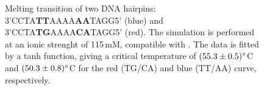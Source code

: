 \begin{figure}[htb]
       \begin{center}
               \scalebox{0.9}{
                        \nonstopmode
                        
                        \errorstopmode
                        \rule[-0.5cm]{0cm}{0cm}}
                \caption{Melting transition of two DNA hairpins: 3'CCTA\textbf{TT}AAAA\textbf{AA}TAGG5' (blue) and 3'CCTA\textbf{TG}AAAA\textbf{CA}TAGG5' (red). The simulation is performed at an ionic strenght of 115\,mM, compatible with \cite{vallone1999melting}. The data is fitted by a tanh function, giving a critical temperature of $(55.3 \pm 0.5)^{\circ}$C and $(50.3 \pm 0.8)^{\circ}$C for the red (TG/CA) and blue (TT/AA) curve, respectively.}
                \label{meltingTemperature}
        \end{center}
\end{figure}

